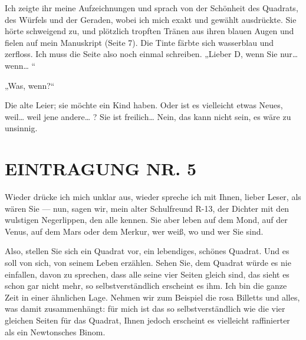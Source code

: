 Ich zeigte ihr meine Aufzeichnungen und sprach von der Schönheit
des Quadrats, des Würfels und der Geraden, wobei ich mich exakt und
gewählt ausdrückte. Sie hörte schweigend zu, und plötzlich tropften
Tränen aus ihren blauen Augen und fielen auf mein Manuskript (Seite
7). Die Tinte färbte sich wasserblau und zerfloss. Ich muss die
Seite also noch einmal schreiben. „Lieber D, wenn Sie nur\ldots{}
wenn\ldots{} “

„Was, wenn?“

Die alte Leier; sie möchte ein Kind haben. Oder ist es vielleicht
etwas Neues, weil\ldots{} weil jene andere\ldots{} ? Sie ist freilich\ldots{}
Nein, das kann nicht sein, es wäre zu unsinnig.

\section{EINTRAGUNG NR. 5}

Wieder drücke ich mich unklar aus, wieder spreche ich mit Ihnen,
lieber Leser, als wären Sie — nun, sagen wir, mein alter
Schulfreund R-13, der Dichter mit den wulstigen Negerlippen, den
alle kennen. Sie aber leben auf dem Mond, auf der Venus, auf dem
Mars oder dem Merkur, wer weiß, wo und wer Sie sind.

Also, stellen Sie sich ein Quadrat vor, ein lebendiges, schönes
Quadrat. Und es soll von sich, von seinem Leben erzählen. Sehen
Sie, dem Quadrat würde es nie einfallen, davon zu sprechen, dass
alle seine vier Seiten gleich sind, das sieht es schon gar nicht
mehr, so selbstverständlich erscheint es ihm. Ich bin die ganze
Zeit in einer ähnlichen Lage. Nehmen wir zum Beispiel die rosa
Billetts und alles, was damit zusammenhängt: für mich ist das so
selbstverständlich wie die vier gleichen Seiten für das Quadrat,
Ihnen jedoch erscheint es vielleicht raffinierter als ein
Newtonsches Binom.

